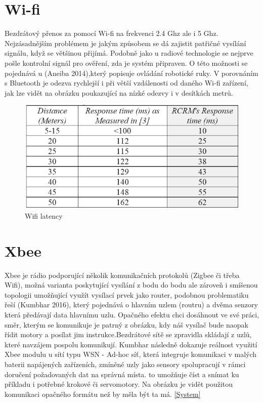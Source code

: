 \documentclass[FM,BP]{tulthesis}
\begin{document}
\section {Wi-fi}
Bezdrátový přenos za pomocí Wi-fi na frekvenci 2.4 Ghz ale i 5 Ghz.  Nejzásadnějším problémem je jakým způsobem se dá zajistit patřičné vysílání signálu, když se většinou přijímá. Podobně jako u radiové technologie se nejprve pošle kontrolní signál pro ověření, zda je systém připraven. O této možnosti se pojednává u (Aneiba 2014),který popisuje ovládání robotické ruky. V porovnáním s Bluetooth je odezva rychlejší i při větší vzdálenosti od daného Wi-fi zařízení, jak lze vidět na obrázku poukazující na nízké odezvy i v desítkách metrů.
\begin{figure}
	\begin{center}
		\includegraphics[scale=1.0]{Wifirange.png}
		\caption{Wifi latency}
		\label{Bluetooth}
	\end{center}
\end{figure} 

\section{Xbee}
Xbee je rádio podporující několik komunikačních protokolů (Zigbee či třeba Wifi),
možná varianta poskytující vysílání z bodu do bodu ale zároveň i smíšenou topologii umožňující využít vysílací prvek jako router, podobnou problematiku řeší (Kumbhar 2016), který pojednává o hlavním uzlem (routru) a dvěma senzory která předávají data hlavnímu uzlu. Opačného efektu chci dosáhnout ve své práci, směr, kterým se komunikuje je patrný z obrázku, kdy náš vysílač bude naopak řídit motory a posílat jim instrukce.Bezdrátové sítě se zpravidla skládají z uzlů, které navzájem pospolu komunikují. Kumbhar následně dokazuje reálnost využití Xbee modulu u sítí typu WSN - Ad-hoc síť, která integruje komunikaci v malých baterii napájených zařízeních, zmíněné uzly jako sensory spolupracují v rámci doručení požadovaných dat na správná místa. to umožňuje číst a snímat ku příkladu i potřebné krokové či servomotory. Na obrázku je vidět použitou komunikaci opačného formátu než by měla být ta má. \ref{System}
\cite{7860081}
\end{document}
